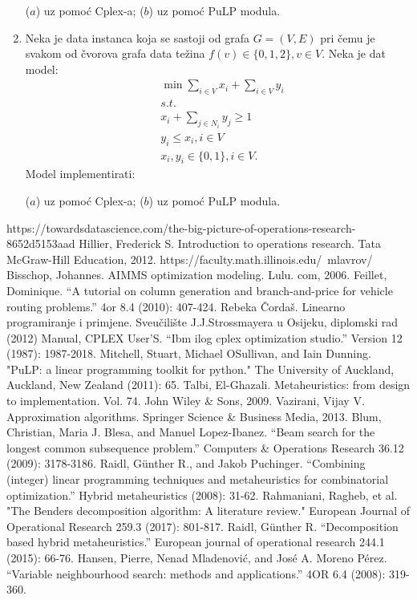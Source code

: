 \documentclass[a4paper, utf8, 11pt, colorlinks]{book}
\begin{document}
\begin{enumerate}
     ($a$) uz pomoć Cplex-a; ($b$) uz pomoć PuLP modula.
    \item %
    Neka je data instanca koja se sastoji od grafa $G=(V,E)$ pri čemu je svakom od čvorova grafa data težina $f(v)  \in \{0, 1, 2\}, v \in V$. Neka je dat model:
    \begin{align*}
          &\min \sum_{i \in V} x_i + \sum_{i \in V} y_i \\
          &s.t. \\
          & x_i + \sum_{j \in N_i } y_j  \geq 1 \\
          & y_i \leq x_i, i \in V \\
          &x_i, y_i \in \{0, 1\}, i \in V.
    \end{align*}
     Model implementirati:

($a$) uz pomoć Cplex-a; ($b$) uz pomoć PuLP modula. 
\end{enumerate}
\begin{thebibliography}{widest entry}
	  {https://towardsdatascience.com/the-big-picture-of-operations-research-8652d5153aad}
	 Hillier, Frederick S. Introduction to operations research. Tata McGraw-Hill Education, 2012.
	  https://faculty.math.illinois.edu/~mlavrov/
	   Bisschop, Johannes. AIMMS optimization modeling. Lulu. com, 2006.
	   Feillet, Dominique. ``A tutorial on column generation and branch-and-price for vehicle routing problems.'' 4or 8.4 (2010): 407-424.
	    Rebeka Čordaš. Linearno programiranje i primjene. Sveu\v cili\v ste J.J.Strossmayera u Osijeku, diplomski rad (2012)
	     Manual, CPLEX User’S. ``Ibm ilog cplex optimization studio.'' Version 12 (1987): 1987-2018.
	   Mitchell, Stuart, Michael OSullivan, and Iain Dunning. "PuLP: a linear programming toolkit for python." The University of Auckland, Auckland, New Zealand (2011): 65.
	      Talbi, El-Ghazali. Metaheuristics: from design to implementation. Vol. 74. John Wiley \& Sons, 2009.
	       Vazirani, Vijay V. Approximation algorithms. Springer Science \& Business Media, 2013.
	        Blum, Christian, Maria J. Blesa, and Manuel Lopez-Ibanez. ``Beam search for the longest common subsequence problem.'' Computers \& Operations Research 36.12 (2009): 3178-3186.
	      Raidl, Günther R., and Jakob Puchinger. ``Combining (integer) linear programming techniques and metaheuristics for combinatorial optimization.'' Hybrid metaheuristics (2008): 31-62.
	           Rahmaniani, Ragheb, et al. "The Benders decomposition algorithm: A literature review." European Journal of Operational Research 259.3 (2017): 801-817.
	         Raidl, Günther R. ``Decomposition based hybrid metaheuristics.'' European journal of operational research 244.1 (2015): 66-76.
	        Hansen, Pierre, Nenad Mladenović, and José A. Moreno Pérez. ``Variable neighbourhood search: methods and applications.'' 4OR 6.4 (2008): 319-360.
\end{thebibliography}
\end{document}
